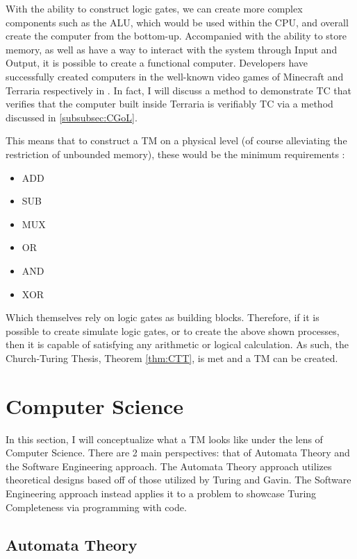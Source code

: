 With the ability to construct logic gates, we can create more complex components such as the ALU, which would be used within the CPU, and overall create the computer from the bottom-up.
Accompanied with the ability to store memory, as well as have a way to interact with the system through Input and Output, it is possible to create a functional computer.
Developers have successfully created computers in the well-known video games of Minecraft and Terraria respectively in \cite{MCTM,TerrariaTM,TerrariaTMGH}.
In fact, I will discuss a method to demonstrate TC that verifies that the computer built inside Terraria is verifiably TC via a method discussed in \ref{subsubsec:CGoL}.

This means that to construct a TM on a physical level (of course alleviating the restriction of unbounded memory), these would be the minimum requirements \cite{nand2tetris,ELTCompSys}:
\begin{itemize}
    \item ADD
    \item SUB
    \item MUX
    \item OR
    \item AND
    \item XOR
\end{itemize}

Which themselves rely on logic gates as building blocks.
Therefore, if it is possible to create simulate logic gates, or to create the above shown processes, then it is capable of satisfying any arithmetic or logical calculation.
As such, the Church-Turing Thesis, Theorem \ref{thm:CTT}, is met and a TM can be created.

\section{Computer Science}\label{sec:CompSci}

In this section, I will conceptualize what a TM looks like under the lens of Computer Science.
There are 2 main perspectives: that of Automata Theory and the Software Engineering approach.
The Automata Theory approach utilizes theoretical designs based off of those utilized by Turing and Gavin.
The Software Engineering approach instead applies it to a problem to showcase Turing Completeness via programming with code.

\subsection{Automata Theory}\label{subsec:AutomataThy}

